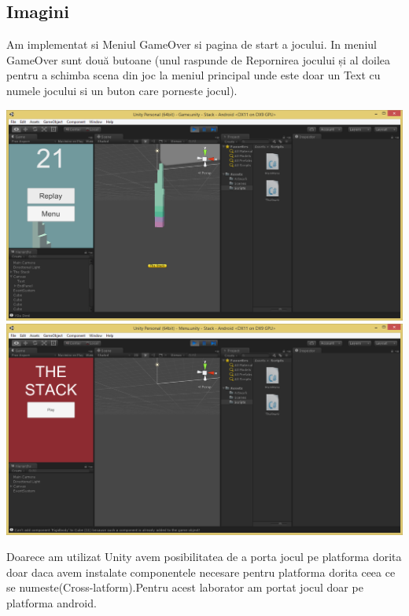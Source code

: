 \subsection{Imagini}
Am implementat si Meniul GameOver si pagina de start a jocului.
In meniul GameOver sunt două butoane (unul raspunde de Repornirea jocului și al doilea pentru a schimba scena din joc la meniul principal unde este doar un Text cu numele jocului si un buton care porneste jocul).
\begin{center}
\includegraphics[scale=0.5]{images/GameOver}\\
\includegraphics[scale=0.5]{images/Menu}\\
\end{center}
Doarece am utilizat Unity avem posibilitatea de a porta jocul pe platforma dorita doar daca avem instalate componentele necesare pentru platforma dorita ceea ce se numeste(Cross-latform).Pentru acest laborator am portat jocul doar pe platforma android.
